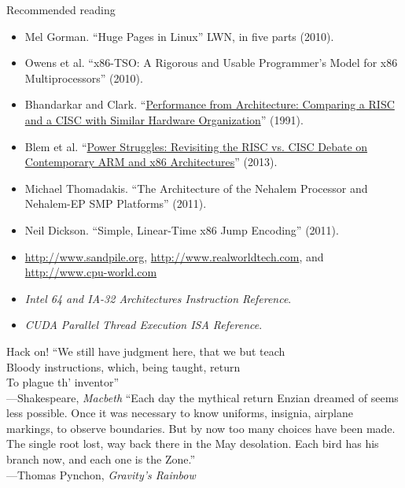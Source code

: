 \documentclass[mathserif,xcolor={dvipsnames,table}]{beamer}
\begin{document}
\begin{frame}{Recommended reading}
\footnotesize{
\begin{itemize}
\item Mel Gorman. ``Huge Pages in Linux'' LWN, in five parts (2010).
\item Owens et al. ``x86-TSO: A Rigorous and Usable Programmer's Model for x86 Multiprocessors'' (2010).
\item Bhandarkar and Clark. ``\href{http://dl.acm.org/citation.cfm?id=107003}{Performance from Architecture: Comparing a
RISC and a CISC with Similar Hardware Organization}'' (1991).
\vfill
\item Blem et al. ``\href{http://research.cs.wisc.edu/vertical/papers/2013/hpca13-isa-power-struggles.pdf}{Power Struggles: Revisiting the RISC vs. CISC Debate on
Contemporary ARM and x86 Architectures}'' (2013).
\vfill
\item Michael Thomadakis. ``The Architecture of the Nehalem Processor and
Nehalem-EP SMP Platforms'' (2011).
\vfill
\item Neil Dickson. ``Simple, Linear-Time x86 Jump Encoding'' (2011).
\vfill
\item \href{http://www.sandpile.org}{http://www.sandpile.org},
\href{http://www.realworldtech.com}{http://www.realworldtech.com}, and
\href{http://www.cpu-world.com}{http://www.cpu-world.com}
\vfill
\item \textit{Intel 64 and IA-32 Architectures Instruction Reference}.
\vfill
\item \textit{CUDA Parallel Thread Execution ISA Reference}.
\end{itemize}
}
\end{frame}

\begin{frame}{Hack on!}
``We still have judgment here, that we but teach\\
Bloody instructions, which, being taught, return\\
To plague th' inventor''\\
\hfill---Shakespeare, \textit{Macbeth}
\vfill
``Each day the mythical return Enzian dreamed of seems less possible. Once it
was necessary to know uniforms, insignia, airplane markings, to observe
boundaries. But by now too many choices have been made. The single root lost,
way back there in the May desolation. Each bird has his branch now, and each
one is the Zone.''\\
\hfill---Thomas Pynchon, \textit{Gravity's Rainbow}
\end{frame}
\end{document}
